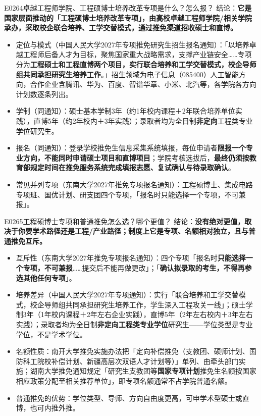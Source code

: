 \begin{qa}{E0264}{卓越工程师学院、工程硕博士培养改革专项是什么？怎么报？}
结论：\textbf{它是国家层面推动的「工程硕博士培养改革专项」，由高校卓越工程师学院/相关学院承办，采取校企联合培养、工学交替模式，通过推免渠道招收硕士和直博。}
\begin{itemize}
  \item 定位与模式（中国人民大学2027年专项推免研究生招生报名通知）：「以培养卓越工程师后备人才为目标，聚焦国家重大战略需求，支撑产业链安全……专项分为\textbf{工程硕士和工程直博两个项目，实行联合培养和工学交替模式，校企导师组共同承担研究生培养工作}。」招生领域为电子信息（085400）人工智能方向，合作企业含腾讯、华为、百度、智谱华章、小米、北汽等，各学院各方向计划数逐条列出。
  \item 学制（同通知）：硕士基本学制3年（约1年校内课程＋2年联合培养单位实践），直博5年（约2年校内＋3年实践）；录取者均为全日制\textbf{非定向}工程类专业学位研究生。
  \item 报名（同通知）：登录学校推免生信息采集系统填报，每位申请者\textbf{限报一个专业方向，不能同时申请硕士项目和直博项目}；学院考核选拔后，\textbf{最终仍须按教育部规定时间在推免服务系统完成填报志愿、复试确认与待录取确认}。
  \item 常见并列专项（东南大学2027年推免专项报名通知）：工程硕博士、集成电路专项班、国优计划、研支团四个专项，「报名时只能选择一个专项，不可兼报」。
\end{itemize}
\end{qa}

\begin{qa}{E0265}{工程硕博士专项和普通推免怎么选？哪个更值？}
结论：\textbf{没有绝对更值，取决于你要学术路径还是工程/产业路径；制度上它是专项、名额相对独立，且与普通推免互斥。}
\begin{itemize}
  \item 互斥性（东南大学2027年推免专项报名通知）：四个专项「报名时\textbf{只能选择一个专项，不可兼报}……提交后不能再做更改」；「\textbf{确认拟录取的考生，不得再参选其他任何专项}」。
  \item 培养差异（中国人民大学2027年专项通知）：实行「联合培养和工学交替模式，校企导师组共同承担研究生培养工作，学生深入工程攻关一线」；硕士学制3年（1年校内课程＋2年左右企业实践），直博5年（2年左右校内＋3年左右实践）；录取者均为全日制\textbf{非定向工程类专业学位}研究生——学位类型是专业学位，不是学术学位。
  \item 名额性质：南开大学推免实施办法把「定向补偿推免（支教团、硕师计划、国防科工院校补偿计划、新疆高层次双语人才计划等）」单列、由牵头部门实施；湖南大学推免通知规定「研究生支教团等\textbf{国家专项计划}推免生名额按国家相应政策分配至相关推荐单位」，即专项名额通常不占学院普通名额。
  \item 普通推免的优势：学位类型、导师、方向自由度更高，可申学术型硕士或直博，也可内推外推。
\end{itemize}
\end{qa}

